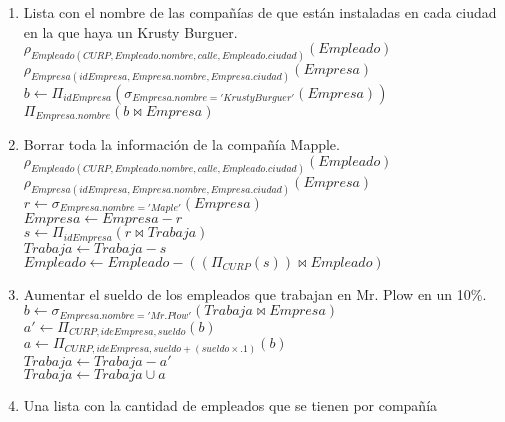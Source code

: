 \documentclass{article}
\begin{document}
\begin{enumerate}
\begin{enumerate}
				\item Lista con el nombre de las compañías de que están instaladas en cada ciudad en la que haya
				un Krusty Burguer.\\
				
				$\rho_{Empleado(CURP, Empleado.nombre, calle, Empleado.ciudad)}(Empleado)$\\
				$\rho_{Empresa(idEmpresa, Empresa.nombre, Empresa.ciudad)}(Empresa)$\\
				$b \leftarrow \Pi_{idEmpresa}(\sigma_{Empresa.nombre = 'Krusty Burguer'}(Empresa))$\\
				$\Pi_{Empresa.nombre}(b \bowtie Empresa)$\\
				
				\item Borrar toda la información de la compañía Mapple.\\
				
				$\rho_{Empleado(CURP, Empleado.nombre, calle, Empleado.ciudad)}(Empleado)$\\
				$\rho_{Empresa(idEmpresa, Empresa.nombre, Empresa.ciudad)}(Empresa)$\\
				$r \leftarrow \sigma_{Empresa.nombre = 'Maple'}(Empresa)$\\
				$Empresa \leftarrow Empresa - r$\\
				$s \leftarrow \Pi_{idEmpresa}(r \bowtie Trabaja)$\\
				$Trabaja \leftarrow Trabaja - s$\\
				$Empleado \leftarrow Empleado - ((\Pi_{CURP}(s)) \bowtie Empleado)$\\
				
				\item Aumentar el sueldo de los empleados que trabajan en Mr. Plow en un 10\%.\\ 
				
				$b \leftarrow \sigma_{Empresa.nombre = 'Mr. Plow'}(Trabaja \bowtie Empresa)$\\
				$a' \leftarrow \Pi_{CURP, ideEmpresa, sueldo}(b)$\\
				$a \leftarrow \Pi_{CURP, ideEmpresa, sueldo + (sueldo \times .1)}(b)$\\
				$Trabaja \leftarrow Trabaja - a'$\\				$Trabaja \leftarrow Trabaja \cup a$
				
				\item Una lista con la cantidad de empleados que se tienen por compañía\\
				

\end{enumerate}
\end{enumerate}
\end{document}
